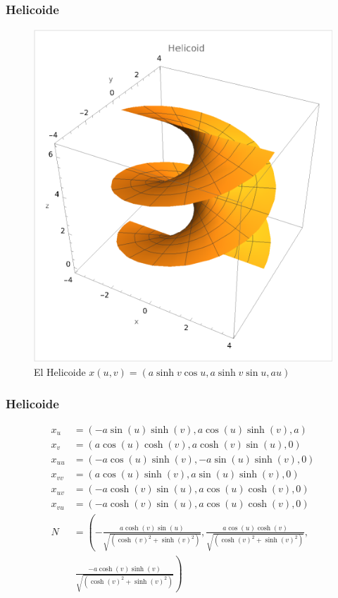 \documentclass[10pt]{beamer}
\begin{document}
      \begin{frame}
        \frametitle{Helicoide}
        \begin{figure}
        \includegraphics[scale=0.4]{imagenes/2.png}
        \caption{El Helicoide $x(u, v) = (a\sinh v\cos u, a\sinh v \sin u, au)$}
        \end{figure}
      \end{frame}

      \begin{frame}
        \frametitle{Helicoide}
        \begin{align*}
          x_u &= \left(-a \sin(u) \sinh(v), a \cos(u) \sinh(v), a\right) \\
          x_v &= \left(a \cos(u) \cosh(v), a \cosh(v) \sin(u), 0\right) \\
          x_{uu} &= \left(-a \cos(u) \sinh(v), -a \sin(u) \sinh(v), 0\right) \\
          x_{vv} &= \left(a \cos(u) \sinh(v), a \sin(u) \sinh(v), 0\right) \\
          x_{uv} &= \left(-a \cosh(v) \sin(u), a \cos(u) \cosh(v), 0\right) \\
          x_{vu} &= \left(-a \cosh(v) \sin(u), a \cos(u) \cosh(v), 0\right) \\
          N &= \left(-\frac{a\cosh(v) \sin(u)}{\sqrt{(\cosh(v)^2 + \sinh(v)^2)}}, \frac{a\cos(u) \cosh(v)}{\sqrt{(\cosh(v)^2 + \sinh(v)^2)}},\right.\\
          & \ \left. \frac{-a\cosh(v) \sinh(v)}{\sqrt{(\cosh(v)^2 + \sinh(v)^2)}}\right)
          \end{align*}
      \end{frame}
\end{document}
